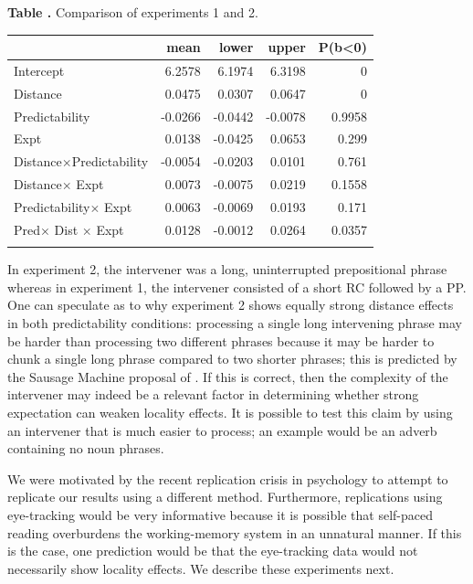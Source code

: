 \documentclass{frontiersSCNS}\usepackage{knitr} %
\begin{document}
\begin{table}[!htbp]
\centering
\textbf{\label{Tab:e1e2comp} Table . }{Comparison of experiments 1 and 2.}
\processtable{}
{\begin{tabular}{lrrrr}\toprule
& mean & lower & upper & P(b<0)\\
  \hline
Intercept & 
6.2578 &
6.1974 &
6.3198 &
0 \\
Distance & 
0.0475 &
0.0307 &
0.0647 &
0 \\
Predictability & 
-0.0266 &
-0.0442 &
-0.0078 &
0.9958 \\
Expt & 
0.0138 &
-0.0425 &
0.0653 &
0.299 \\
Distance$\times$Predictability  & 
-0.0054 &
-0.0203 &
0.0101 &
0.761 \\
Distance$\times$ Expt & 
0.0073 &
-0.0075 &
0.0219 &
0.1558 \\
Predictability$\times$ Expt & 
0.0063 &
-0.0069 &
0.0193 &
0.171 \\
Pred$\times$ Dist $\times$ Expt & 
0.0128 &
-0.0012 &
0.0264 &
0.0357 \\
\botrule
\end{tabular}}{}
\end{table}

In experiment 2, the intervener was a long, uninterrupted prepositional phrase whereas in experiment 1, the intervener consisted of a short RC followed by a PP. One can speculate as to why experiment  2 shows equally strong distance effects in both predictability conditions: processing a single long intervening phrase may be harder than processing two different phrases because it may be harder to chunk a single long phrase compared to two shorter phrases; this is predicted by the Sausage Machine proposal of  \citet{frazier1978sausage}. If this is correct, then the complexity of the intervener may indeed be a relevant factor in determining whether strong expectation can weaken locality effects. It is possible to test this claim by using an intervener that is much easier to process; an example would be an adverb containing no noun phrases. 

We were motivated by the recent replication crisis in psychology \citep{open2015estimating}  to attempt to replicate our results using a different method. Furthermore, replications using eye-tracking would be very informative because it is possible that self-paced reading overburdens the working-memory system in an unnatural manner. If this is the case, one prediction would be that the eye-tracking data would not necessarily show locality effects.
We describe these experiments next.
\end{document}
